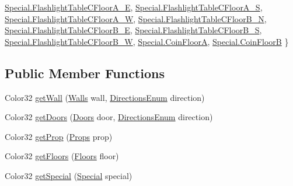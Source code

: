 \begin{DoxyCompactItemize}
\mbox{\hyperlink{class_elements_collection_af92a57db43ac98e7d4ac2b5bafe69284a5ed1ce1f7d4a8a56b795b04a76e72047}{Special.\+Flashlight\+Table\+C\+Floor\+A\+\_\+E}}, 
\mbox{\hyperlink{class_elements_collection_af92a57db43ac98e7d4ac2b5bafe69284abc9155e3a6b1ed9495fc392ac0cd789b}{Special.\+Flashlight\+Table\+C\+Floor\+A\+\_\+S}}, 
\newline
\mbox{\hyperlink{class_elements_collection_af92a57db43ac98e7d4ac2b5bafe69284a7f6f66bdfa2059f3c76881cbf6baf062}{Special.\+Flashlight\+Table\+C\+Floor\+A\+\_\+W}}, 
\mbox{\hyperlink{class_elements_collection_af92a57db43ac98e7d4ac2b5bafe69284a46088524639adf6b6d155c59d0ca6400}{Special.\+Flashlight\+Table\+C\+Floor\+B\+\_\+N}}, 
\mbox{\hyperlink{class_elements_collection_af92a57db43ac98e7d4ac2b5bafe69284a4bdd2dd4725b5c492e926827d494dc86}{Special.\+Flashlight\+Table\+C\+Floor\+B\+\_\+E}}, 
\mbox{\hyperlink{class_elements_collection_af92a57db43ac98e7d4ac2b5bafe69284ac867af65dfd2bedcea457adfb0293156}{Special.\+Flashlight\+Table\+C\+Floor\+B\+\_\+S}}, 
\newline
\mbox{\hyperlink{class_elements_collection_af92a57db43ac98e7d4ac2b5bafe69284a95f6460981474ee9e741550ed0d4a9ba}{Special.\+Flashlight\+Table\+C\+Floor\+B\+\_\+W}}, 
\mbox{\hyperlink{class_elements_collection_af92a57db43ac98e7d4ac2b5bafe69284ad4bf8c60b5952947ef69d833d979dabb}{Special.\+Coin\+FloorA}}, 
\mbox{\hyperlink{class_elements_collection_af92a57db43ac98e7d4ac2b5bafe69284abb3fd5999acce0c834c519907007d656}{Special.\+Coin\+FloorB}}
 \}
\end{DoxyCompactItemize}
\subsection*{Public Member Functions}
\begin{DoxyCompactItemize}
\item 
Color32 \mbox{\hyperlink{class_elements_collection_a375dc91e04eefe3bbcbd1d7c5126e538}{get\+Wall}} (\mbox{\hyperlink{class_elements_collection_ab13b688210e7e8a238d0fcda6c22ee59}{Walls}} wall, \mbox{\hyperlink{_directions_enum_8cs_a6bd1f747985f3fcfa3faca85ff3fd8e8}{Directions\+Enum}} direction)
\item 
Color32 \mbox{\hyperlink{class_elements_collection_acf49ed1252bb6f6dffdfa70fb5da5ecc}{get\+Doors}} (\mbox{\hyperlink{class_elements_collection_a21917dc4f24ee93da7275d2fd256d0ff}{Doors}} door, \mbox{\hyperlink{_directions_enum_8cs_a6bd1f747985f3fcfa3faca85ff3fd8e8}{Directions\+Enum}} direction)
\item 
Color32 \mbox{\hyperlink{class_elements_collection_accdb5e65ee93f2c0bad3409f17590e05}{get\+Prop}} (\mbox{\hyperlink{class_elements_collection_ac2ee575d2d4b1175b1b36ff3a9080e18}{Props}} prop)
\item 
Color32 \mbox{\hyperlink{class_elements_collection_afa01e105e1cb767d887b3241c403e134}{get\+Floors}} (\mbox{\hyperlink{class_elements_collection_acf60df237ffe824b0271fa124c804996}{Floors}} floor)
\item 
Color32 \mbox{\hyperlink{class_elements_collection_aabdf48ae1c87c9c9aeef455d0df387ef}{get\+Special}} (\mbox{\hyperlink{class_elements_collection_af92a57db43ac98e7d4ac2b5bafe69284}{Special}} special)
\end{DoxyCompactItemize}


